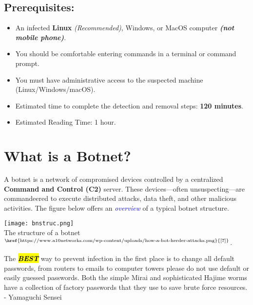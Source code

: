 \documentclass{article}
\begin{document}
 \subsection*{Prerequisites:}
\begin{itemize}
    \item An infected \textbf{Linux} \textit{(Recommended)}, Windows, or MacOS computer \textbf{\textit{(not mobile phone)}}.
    \item You should be comfortable entering commands in a terminal or command prompt.
    \item You must have administrative access to the suspected machine (Linux/Windows/macOS).
    \item Estimated time to complete the detection and removal steps: \textbf{120 minutes}.
    \item Estimated Reading Time: 1 hour.
\end{itemize}

\section{What is a Botnet?}
\noindent A botnet is a network of compromised devices controlled by a centralized \textbf{Command and Control (C2)} server. These devices—often unsuspecting—are commandeered to execute distributed attacks, data theft, and other malicious activities. The figure below offers an \textit{\textcolor{blue}{overview}} of a typical botnet structure.
\begin{tcolorbox}[
  colback=backcolour,
  colframe=blue!75!black,
  title={Botnet Structure},
  fonttitle=\bfseries\large\centering,
  arc=4mm,
  boxrule=1pt,
  left=10pt, right=10pt,
  top=10pt, bottom=10pt,
  enhanced
]
\centering
\texttt{[image: bnstruc.png]}\\[2mm]
The structure of a botnet$^{\text{\href{https://www.a10networks.com/wp-content/uploads/how-a-bot-herder-attacks.png}{[7]}}}$.
\end{tcolorbox}
\begin{tcolorbox}[
  colback=backcolour,
  colframe=red!100!black,
  title={\underline{Prevention Tip}},
  fonttitle=\bfseries\large\centering,
  arc=4mm,
  boxrule=1pt,
  left=10pt, right=10pt,
  top=10pt, bottom=10pt,
  enhanced
]
The \textbf{\textit{\hl{BEST}}} way to prevent infection in the first place is to change all default passwords, from routers to emails to computer towers please do not use default or easily guessed passwords. Both the simple Mirai and sophisticated Hajime worms have a collection of factory passwords that they use to save brute force resources.\\ \quad
- Yamaguchi Sensei
\end{tcolorbox}
\end{document}
